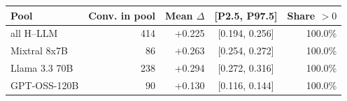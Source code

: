 \begin{tabular}{lrrcr}
\toprule
Pool & Conv. in pool & Mean $\Delta$ & [P2.5, P97.5] & Share $>0$ \\
\midrule
all H--LLM & 414 & +0.225 & [0.194, 0.256] & 100.0\% \\
Mixtral 8x7B & 86 & +0.263 & [0.254, 0.272] & 100.0\% \\
Llama 3.3 70B & 238 & +0.294 & [0.272, 0.316] & 100.0\% \\
GPT-OSS-120B & 90 & +0.130 & [0.116, 0.144] & 100.0\% \\
\bottomrule
\end{tabular}
